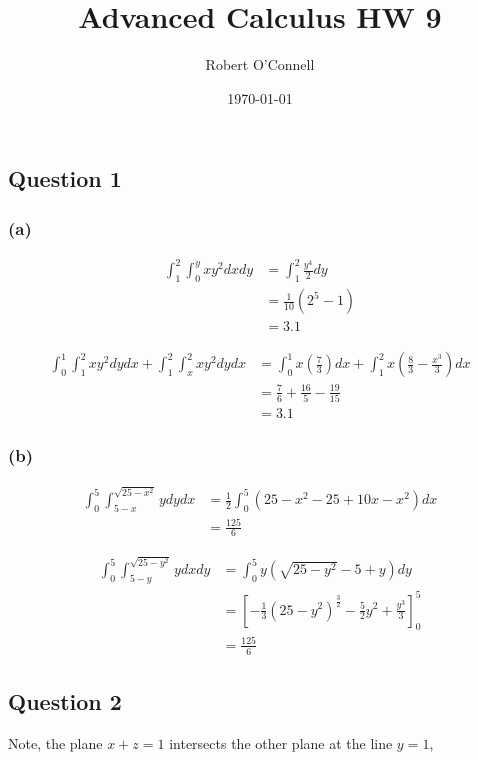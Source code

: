 \documentclass{article}
\title{\textbf{Advanced Calculus HW 9}}
\author{Robert O'Connell}
\date{\today}
\begin{document}
\maketitle
\vspace{5mm}
\subsection*{Question 1}
\subsubsection*{(a)}
\begin{align*}
    \int_{1}^{2} \int_{0}^{y} xy^2 dx dy &= \int_{1}^{2} \frac{y^4}{2} dy \\
    &= \frac{1}{10}(2^5 - 1) \\
    &= 3.1
\end{align*}

\begin{align*}
    \int_{0}^{1} \int_{1}^{2} xy^2 dy dx + \int_{1}^{2} \int_{x}^{2} xy^2 dy dx &= \int_{0}^{1} x(\frac{7}{3}) dx + \int_{1}^{2} x(\frac{8}{3} - \frac{x^3}{3}) dx \\
    &= \frac{7}{6} + \frac{16}{5} - \frac{19}{15} \\
    &= 3.1
\end{align*}

\subsubsection*{(b)}
\begin{align*}
    \int_{0}^{5} \int_{5-x}^{\sqrt{25 - x^2}} y dy dx &= \frac{1}{2} \int_{0}^{5} (25 - x^2 - 25 + 10x - x^2) dx \\
    &= \frac{125}{6}
\end{align*}

\begin{align*}
    \int_{0}^{5}\int_{5-y}^{\sqrt{25-y^2}} y dx dy &= \int_{0}^{5} y(\sqrt{25 - y^2} - 5+y) dy \\
    &= \left[ -\frac{1}{3}(25-y^2)^\frac{3}{2} - \frac{5}{2}y^2 + \frac{y^3}{3}\right]_0^5 \\
    &= \frac{125}{6}
\end{align*}

\subsection*{Question 2}
Note, the plane \(x+z =1\) intersects the other plane at the line \(y = 1\), 
\end{document}
